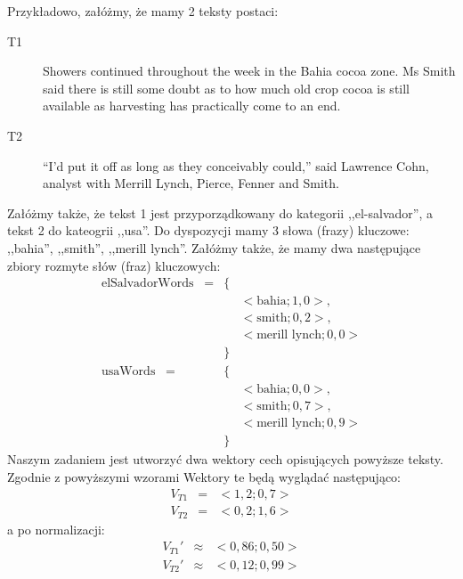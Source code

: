 \documentclass[a4paper]{classrep}
\begin{document}
Przykładowo, załóżmy, że mamy 2 teksty postaci:
\begin{description}
\item [T1]Showers continued throughout the week in the Bahia cocoa zone. Ms Smith said there is still some doubt as to how 
much old crop cocoa is still available as harvesting has practically come to an end.
\item [T2]``I'd put it off as long as they conceivably could,'' said Lawrence Cohn, analyst with Merrill Lynch, Pierce, Fenner and Smith.
\end{description}
Załóżmy także, że tekst 1 jest przyporządkowany do kategorii ,,el-salvador'', a tekst 2 do kateogrii ,,usa''.
Do dyspozycji mamy 3 słowa (frazy) kluczowe: ,,bahia'', ,,smith'', ,,merill lynch''. Załóżmy także, że mamy dwa następujące zbiory rozmyte słów (fraz) kluczowych:
\begin{eqnarray*}
\textrm{elSalvadorWords}\;\;\;= &\{& \\
  && <\textrm{bahia}; 1{,}0>, \\
  && <\textrm{smith}; 0{,}2>, \\
  && <\textrm{merill lynch}; 0{,}0> \\
  &\}& \\
\textrm{usaWords}\;\;\;= &\{& \\
  && <\textrm{bahia}; 0{,}0>, \\
  && <\textrm{smith}; 0{,}7>, \\
  && <\textrm{merill lynch}; 0{,}9> \\
  &\}&
\end{eqnarray*}
Naszym zadaniem jest utworzyć dwa wektory cech opisujących powyższe teksty. Zgodnie z powyższymi wzorami Wektory te będą wyglądać następująco:
\begin{eqnarray*}
V_{T1} &=& <1{,}2; 0{,}7> \\
V_{T2} &=& <0{,}2; 1{,}6>
\end{eqnarray*}
a po normalizacji:
\begin{eqnarray*}
V_{T1}' &\approx& <0{,}86; 0{,}50> \\
V_{T2}' &\approx& <0{,}12; 0{,}99>
\end{eqnarray*}
\end{document}
